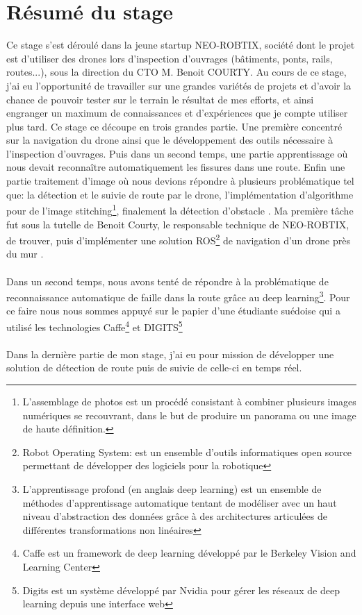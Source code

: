 \section{Résumé du stage}

Ce stage s'est déroulé dans la jeune startup NEO-ROBTIX, société dont le projet est d'utiliser des drones lors d'inspection d'ouvrages (bâtiments, ponts, rails, routes...), sous la direction du CTO M. Benoit COURTY. 
Au cours de ce stage, j'ai eu l'opportunité de travailler sur une grandes variétés de projets et d'avoir la chance de pouvoir tester sur le terrain le résultat de mes efforts, et ainsi engranger un maximum de connaissances et d'expériences que je compte utiliser plus tard.
\newline
\newline
Ce stage ce découpe en trois grandes partie. Une première concentré sur la navigation du drone ainsi que le développement des outils nécessaire à l'inspection d'ouvrages. Puis dans un second temps, une partie apprentissage où nous devait reconnaître automatiquement les fissures dans une route. Enfin une partie traitement d'image où nous devions répondre à plusieurs problématique tel que: la détection et le suivie de route par le drone, l'implémentation d'algorithme pour de l'image stitching\footnote{L'assemblage de photos est un procédé consistant à combiner plusieurs images numériques se recouvrant, dans le but de produire un panorama ou une image de haute définition.}, finalement la détection d'obstacle .
\newline
\newline
Ma première tâche fut sous la tutelle de Benoit Courty, le responsable technique de NEO-ROBTIX, de trouver, puis d'implémenter une solution ROS\footnote{Robot Operating System: est un ensemble d'outils informatiques open source permettant de développer des logiciels pour la robotique} de navigation d'un drone près du mur .
\\
\\
Dans un second temps, nous avons tenté de répondre à la problématique de reconnaissance automatique de faille dans la route grâce au deep learning\footnote{L'apprentissage profond (en anglais deep learning) est un ensemble de méthodes d'apprentissage automatique tentant de modéliser avec un haut niveau d’abstraction des données grâce à des architectures articulées de différentes transformations non linéaires}. Pour ce faire nous nous sommes appuyé sur le papier d'une étudiante suédoise qui a utilisé les technologies Caffe\footnote{Caffe est un framework de deep learning développé par le Berkeley Vision and Learning Center} et DIGITS\footnote{Digits est un système développé par Nvidia pour gérer les réseaux de deep learning depuis une interface web}
\\
\\
Dans la dernière partie de mon stage, j'ai eu pour mission de développer une solution de détection de route puis de suivie de celle-ci en temps réel.

